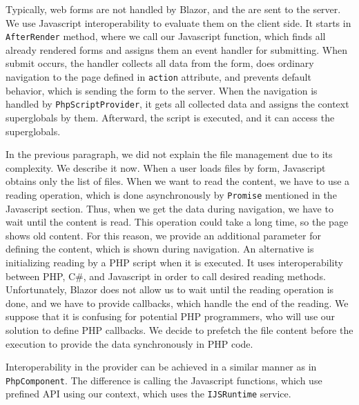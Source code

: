 Typically, web forms are not handled by Blazor, and the are sent to the server.
We use Javascript interoperability to evaluate them on the client side.
It starts in \texttt{AfterRender} method, where we call our Javascript function, which finds all already rendered forms and assigns them an event handler for submitting.
When submit occurs, the handler collects all data from the form, does ordinary navigation to the page defined in \texttt{action} attribute, and prevents default behavior, which is sending the form to the server.
When the navigation is handled by \texttt{PhpScriptProvider}, it gets all collected data and assigns the context superglobals by them.
Afterward, the script is executed, and it can access the superglobals.
\par
In the previous paragraph, we did not explain the file management due to its complexity.
We describe it now.
When a user loads files by form, Javascript obtains only the list of files. 
When we want to read the content, we have to use a reading operation, which is done asynchronously by \texttt{Promise} mentioned in the Javascript section.
Thus, when we get the data during navigation, we have to wait until the content is read.
This operation could take a long time, so the page shows old content.
For this reason, we provide an additional parameter for defining the content, which is shown during navigation.
An alternative is initializing reading by a PHP script when it is executed.
It uses interoperability between PHP, C\#, and Javascript in order to call desired reading methods.
Unfortunately, Blazor does not allow us to wait until the reading operation is done, and we have to provide callbacks, which handle the end of the reading.
We suppose that it is confusing for potential PHP programmers, who will use our solution to define PHP callbacks.
We decide to prefetch the file content before the execution to provide the data synchronously in PHP code.
\par
Interoperability in the provider can be achieved in a similar manner as in \texttt{PhpComponent}.
The difference is calling the Javascript functions, which use prefined API using our context, which uses the \texttt{IJSRuntime} service.


            
 